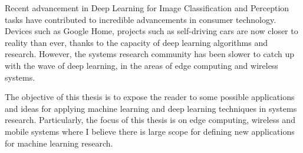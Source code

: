 
Recent advancement in Deep Learning for Image Classification and Perception tasks have contributed to incredible advancements in consumer technology.
 Devices such as Google Home, projects such as self-driving cars are now closer to reality than ever, thanks to the capacity of deep learning algorithms and research.
 However, the systems research community has been slower to catch up with the wave of deep learning, in the areas of edge computing and wireless systems.

The objective of this thesis is to expose the reader to some possible applications and ideas for applying machine learning and deep learning techniques in systems research.
 Particularly, the focus of this thesis is on edge computing, wireless and mobile systems where I believe there is large scope for defining new applications for machine learning research.
